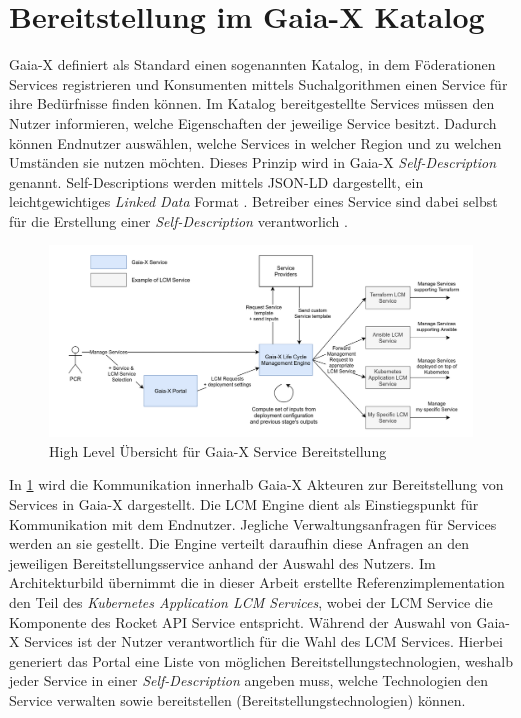 \section{Bereitstellung im Gaia-X Katalog}
\label{sec:gaia-x-einbettung:gaia-x-katalog}
Gaia-X definiert als Standard einen sogenannten Katalog, in dem Föderationen Services registrieren
und Konsumenten mittels Suchalgorithmen einen Service für ihre Bedürfnisse finden können.
Im Katalog bereitgestellte Services müssen den Nutzer informieren, welche Eigenschaften der jeweilige Service besitzt.
Dadurch können Endnutzer auswählen, welche Services in welcher Region und zu welchen Umständen sie nutzen möchten.
Dieses Prinzip wird in Gaia-X \emph{Self-Description} genannt. 
Self-Descriptions werden mittels JSON-LD dargestellt, ein
leichtgewichtiges \emph{Linked Data} Format \cite{Eggers2020}.
Betreiber eines Service sind dabei selbst für die Erstellung einer \emph{Self-Description} verantworlich \cite{GaiaXArchitecture2021}.

\begin{figure}
  \centering
  \includegraphics[width=\textwidth]{gfx/chapters/4_gaia-X/orchestration_overview.png}
  \caption{High Level Übersicht für Gaia-X Service Bereitstellung}
  \label{fig:gaia-x-orchestration-overview}
\end{figure}

In \ref{fig:gaia-x-orchestration-overview} wird die Kommunikation innerhalb Gaia-X Akteuren
zur Bereitstellung von Services in Gaia-X dargestellt.
Die \ac{LCM} Engine dient als Einstiegspunkt für Kommunikation mit dem Endnutzer. Jegliche Verwaltungsanfragen
für Services werden an sie gestellt. Die Engine verteilt daraufhin diese Anfragen
an den jeweiligen Bereitstellungsservice anhand der Auswahl des Nutzers.
Im Architekturbild übernimmt die in dieser Arbeit erstellte Referenzimplementation
den Teil des \emph{Kubernetes Application LCM Services}, wobei der \ac{LCM} Service die
Komponente des Rocket API Service entspricht.
Während der Auswahl von Gaia-X Services ist der Nutzer verantwortlich für die Wahl des \ac{LCM} Services.
Hierbei generiert das Portal eine Liste von möglichen Bereitstellungstechnologien,
weshalb jeder Service in einer \emph{Self-Description} angeben muss, welche Technologien den Service
verwalten sowie bereitstellen (Bereitstellungstechnologien) können.

